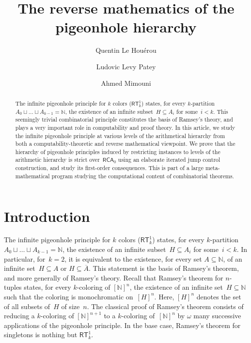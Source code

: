\documentclass{article}
\author{Quentin Le Hou\'erou \and Ludovic Levy Patey \and Ahmed Mimouni}
\title{The reverse mathematics of the pigeonhole hierarchy}
\def\NN{\mathbb{N}}
\newcommand{\RCA}{\mathsf{RCA}}
\newcommand{\RT}{\mathsf{RT}}
\numberwithin{theorem}{section}
\theoremstyle{definition}
\begin{document}
\maketitle

\begin{abstract}
The infinite pigeonhole principle for $k$ colors ($\RT^1_k$) states, for every  $k$-partition $A_0 \sqcup \dots \sqcup A_{k-1} = \NN$, the existence of an infinite subset~$H \subseteq A_i$ for some~$i < k$. This seemingly trivial combinatorial principle constitutes the basis of Ramsey's theory, and plays a very important role in computability and proof theory. In this article, we study the infinite pigeonhole principle at various levels of the arithmetical hierarchy from both a computability-theoretic and reverse mathematical viewpoint. We prove that the hierarchy of pigeonhole principles induced by restricting instances to levels of the arithmetic hierarchy is strict over~$\RCA_0$ using an elaborate iterated jump control construction, and study its first-order consequences.
This is part of a large meta-mathematical program studying the computational content of combinatorial theorems.
\end{abstract}

\section{Introduction}

The infinite pigeonhole principle for $k$ colors ($\RT^1_k$) states, for every $k$-partition $A_0 \sqcup \dots \sqcup A_{k-1} = \NN$, the existence of an infinite subset~$H \subseteq A_i$ for some~$i < k$. In particular, for~$k = 2$, it is equivalent to the existence, for every set $A \subseteq \NN$, of an infinite set~$H \subseteq A$ or $H \subseteq \overline{A}$. This statement is the basis of Ramsey's theorem, and more generally of Ramsey's theory. Recall that Ramsey's theorem for $n$-tuples states, for every $k$-coloring of $[\NN]^n$, the existence of an infinite set~$H \subseteq \NN$ such that the coloring is monochromatic on~$[H]^n$. Here, $[H]^n$ denotes the set of all subsets of~$H$ of size~$n$. The classical proof of Ramsey's theorem consists of reducing a $k$-coloring of $[\NN]^{n+1}$ to a $k$-coloring of~$[\NN]^n$ by $\omega$ many successive applications of the pigeonhole principle. In the base case, Ramsey's theorem for singletons is nothing but $\RT^1_k$.
\end{document}
